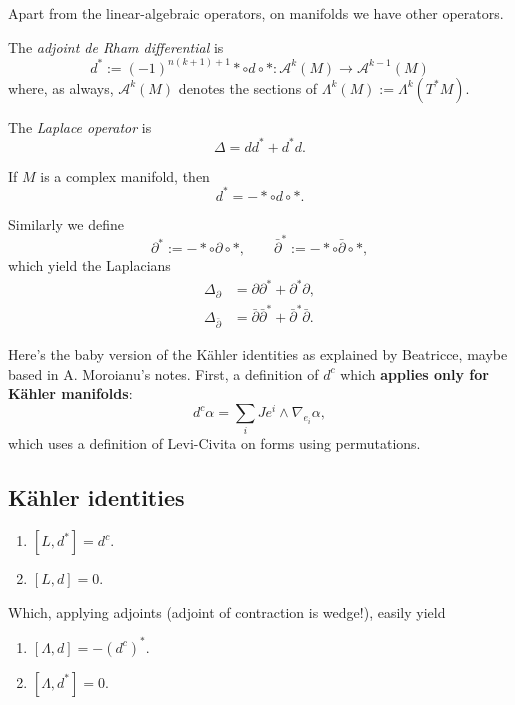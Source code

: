 \medskip\noindent
Apart from the linear-algebraic operators,
on manifolds we have other operators.

\begin{definition}
\label{definition-adjoi-de-rham-diffe}
The {\it adjoint de Rham differential} is
$$
d^*:=(-1)^{n(k+1)+1}*\circ d\circ *
:\mathcal{A}^k(M) \to \mathcal{A}^{k-1}(M)
$$
where, as always, $\mathcal{A}^k(M)$ denotes
the
sections of $\Lambda^k(M):=\Lambda^k(T^*M)$.
\end{definition}

\begin{definition}
\label{definition-laplace}
The {\it Laplace operator} is
$$
\Delta=d d^*+d^*d.
$$
\end{definition}

\noindent
If $M$ is a complex manifold,
then
$$
d^*=-*\circ d \circ *.
$$

Similarly we define
$$
\partial^*:=-* \circ \partial \circ *,
\qquad
\bar\partial^*:=-* \circ \bar\partial \circ
*,
$$
which yield the Laplacians
$$
\begin{aligned}
\Delta_\partial&=\partial \partial^*
+\partial^*\partial,\\
\Delta_{\bar\partial}&=\bar\partial
\bar\partial^*+\bar\partial^*\bar\partial.
\end{aligned}
$$
 

\medskip\noindent
Here's the baby version
of the Kähler identities as
explained by Beatricce, maybe based in
A. Moroianu's notes. First,
a definition of $d^c$ which {\bf applies
only for Kähler manifolds}:
$$
d^c \alpha
=
\sum_i J e^i \wedge \nabla_{e_i}\alpha,
$$
which uses a definition of Levi-Civita
on forms using permutations.

\subsection{Kähler identities}
\label{subsection-kahler-identities}

\begin{lemma}
\label{lemma-baby-kahler-identities}
\begin{enumerate}
\item $[L,d^*]=d^c$.
\item $[L,d]=0$.
\end{enumerate}

\noindent
Which, applying adjoints
(adjoint of contraction is wedge!), 
easily yield
\begin{enumerate}
\item $[\Lambda,d]=-(d^c)^*$.
\item $[\Lambda,d^*]=0$.
\end{enumerate}
\end{lemma}

